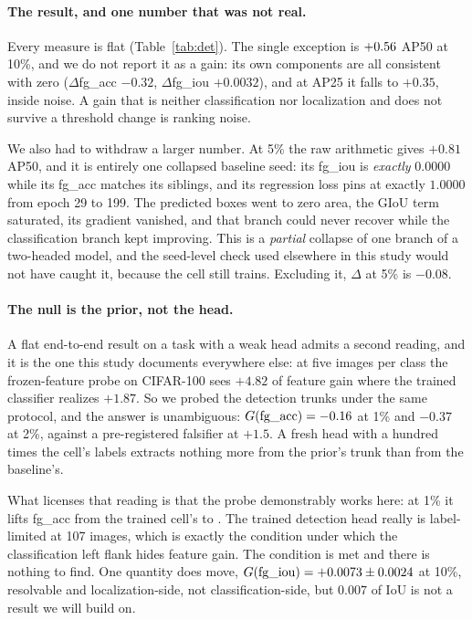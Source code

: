 \paragraph{The result, and one number that was not real.} Every measure is flat
(Table~\ref{tab:det}). The single exception is $+0.56$ AP50 at 10\%,
and we do not report it as a gain: its own components are all consistent with
zero ($\Delta$fg\_acc $-0.32$, $\Delta$fg\_iou $+0.0032$), and at AP25 it
falls to $+0.35$, inside noise. A gain that is neither classification nor
localization and does not survive a threshold change is ranking noise.

We also had to withdraw a larger number. At 5\% the raw arithmetic gives
$+0.81$ AP50, and it is entirely one collapsed baseline seed: its fg\_iou is
\emph{exactly} $0.0000$ while its fg\_acc matches its siblings, and its
regression loss pins at exactly $1.0000$ from epoch 29 to 199. The predicted
boxes went to zero area, the GIoU term saturated, its gradient vanished, and
that branch could never recover while the classification branch kept improving.
This is a \emph{partial} collapse of one branch of a two-headed model, and the
seed-level check used elsewhere in this study would not have caught it, because
the cell still trains. Excluding it, $\Delta$ at 5\% is $-0.08$.

\paragraph{The null is the prior, not the head.} A flat end-to-end result on a
task with a weak head admits a second reading, and it is the one this study
documents everywhere else: at five images per class the frozen-feature probe on
CIFAR-100 sees $+4.82$ of feature gain where the trained classifier realizes
$+1.87$. So we probed the detection trunks under the same protocol, and the
answer is unambiguous: $G(\mathrm{fg\_acc}) = -0.16$ at 1\% and $-0.37$
at 2\%, against a pre-registered falsifier at $+1.5$. A fresh head with a
hundred times the cell's labels extracts nothing more from the prior's trunk
than from the baseline's.

What licenses that reading is that the probe demonstrably works here: at 1\% it
lifts fg\_acc from the trained cell's \detOneFgAcc{} to \detProbeLiftOne. The
trained detection head really is label-limited at 107 images, which is exactly
the condition under which the classification left flank hides feature gain. The
condition is met and there is nothing to find. One quantity does move,
$G(\mathrm{fg\_iou}) = +0.0073 \pm 0.0024$ at 10\%, resolvable
and localization-side, not classification-side, but $0.007$ of IoU is not a
result we will build on.

